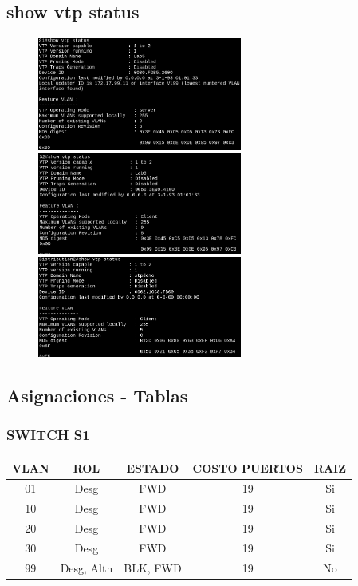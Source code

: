 \documentclass[letterpaper,12pt]{article}
\begin{document}
\begin{sloppypar}
\subsection{show vtp status}
\begin{figure}[H]
    \centering
    \includegraphics[width=0.6\textwidth]{vtp1.png}
    \vspace{0.3cm}\\ 
    \includegraphics[width=0.6\textwidth]{vtp2.png}
    \vspace{0.3cm}\\ 
    \includegraphics[width=0.6\textwidth]{vtp3.png}
\end{figure}
\newpage
\subsection{Asignaciones - Tablas}
\subsubsection{SWITCH S1}
    \begin{center}
        \begin{tabular}{|c|c|c|c|c|} \hline
        VLAN & ROL & ESTADO & COSTO PUERTOS & RAIZ \\ \hline
        01 & Desg & FWD & 19 & Si  \\ \hline
        10 & Desg & FWD & 19 & Si \\ \hline 
        20 & Desg & FWD & 19 & Si \\ \hline
        30 & Desg & FWD & 19 & Si \\ \hline
        99 & Desg, Altn & BLK, FWD & 19 & No \\ \hline
        \end{tabular}   
    \end{center}

\end{sloppypar}
\end{document}
